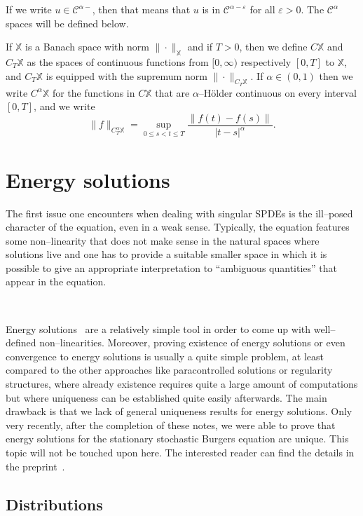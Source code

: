 \documentclass[a4paper,11pt]{article}
\newcommand{\cdummy}{\cdot}
\newcommand{\nosymbol}{}
\newcommand{\CC}{\mathscr{C}}
\begin{document}
If we write $u \in \CC^{\alpha -}$, then that means that $u$ is in
$\CC^{\alpha - \varepsilon}$ for all $\varepsilon > 0$. The $\CC^{\alpha}$
spaces will be defined below.

If $\mathbb{X}$ is a Banach space with norm $\| \cdummy
\|_{\mathbb{X}}$ and if $T > 0$, then we define $C\mathbb{X}$ and $C_T
\mathbb{X}$ as the spaces of continuous functions from $[0, \infty)$
respectively $[0, T]$ to $\mathbb{X}$, and $C_T \mathbb{X}$ is equipped with
the supremum norm $\| \nosymbol \cdummy \|_{C_T \mathbb{X}}$. If $\alpha \in
(0, 1)$ then we write $C^{\alpha} \mathbb{X}$ for the functions in
$C\mathbb{X}$ that are $\alpha$--H{\"o}lder continuous on every interval $[0,
T]$, and we write
\[ \| f \|_{C^{\alpha}_T \mathbb{X}} = \sup_{0 \leqslant s < t \leqslant T}
   \frac{\| f (t) - f (s) \|}{| t - s |^{\alpha}} . \]

\section{Energy solutions}\label{sec:energy}

The first issue one encounters when dealing with singular SPDEs is the
ill--posed character of the equation, even in a weak sense. Typically, the equation features some non--linearity that does not make sense in the natural spaces where solutions live
and one has to provide a suitable smaller space in which it is possible to
give an appropriate interpretation to ``ambiguous quantities'' that appear in the equation.

\

Energy
solutions~{\cite{goncalves_universality_2010,gubinelli_regularization_2013}}
are a relatively simple tool in order to come up with well--defined
non--linearities. Moreover, proving existence of energy solutions or even convergence
to energy solutions is usually a quite simple problem, at least compared to
the other approaches like paracontrolled solutions or regularity structures,
where already existence requires quite a large amount of computations but
where uniqueness can be established quite easily afterwards.
The main drawback is that we lack of general uniqueness results for energy solutions. Only very recently, after the completion of these notes, we were able to prove that energy solutions for the stationary stochastic Burgers equation are unique. This topic will not be touched upon here. The interested reader can find the details in the preprint~\cite{Gubinelli2015b}. 

\subsection{Distributions}
\end{document}
